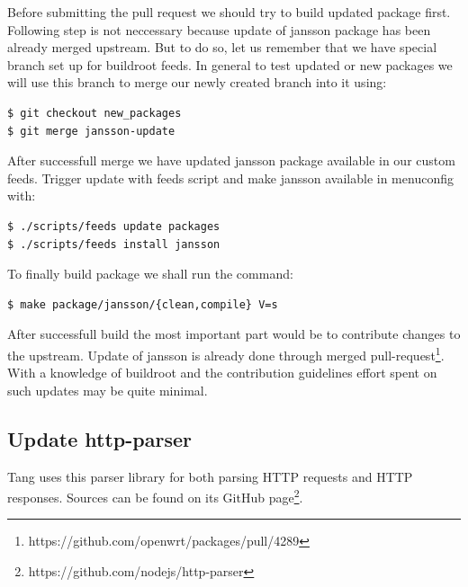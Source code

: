 Before submitting the pull request we should try to build updated package first.
Following step is not neccessary because update of jansson package has been already merged upstream.
But to do so, let us remember that we have special branch set up for buildroot feeds.
In general to test updated or new packages we will use this branch to merge our newly created branch into it using:
\begin{lstlisting}[columns=fixed,basicstyle=\ttfamily\footnotesize,tabsize=4,backgroundcolor=\color{yellow!10}]
$ git checkout new_packages
$ git merge jansson-update
\end{lstlisting}
After successfull merge we have updated jansson package available in our custom feeds.
Trigger update with feeds script and make jansson available in menuconfig with:
\begin{lstlisting}[columns=fixed,basicstyle=\ttfamily\footnotesize,tabsize=4,backgroundcolor=\color{yellow!10}]
$ ./scripts/feeds update packages
$ ./scripts/feeds install jansson
\end{lstlisting}
To finally build package we shall run the command:
\begin{lstlisting}[columns=fixed,basicstyle=\ttfamily\footnotesize,tabsize=4,backgroundcolor=\color{yellow!10}]
$ make package/jansson/{clean,compile} V=s
\end{lstlisting}

After successfull build the most important part would be to contribute changes to the upstream.
Update of jansson is already done through merged pull-request\footnote{https://github.com/openwrt/packages/pull/4289}.
With a knowledge of buildroot and the contribution guidelines effort spent on such updates may be quite minimal.



\subsection{Update http-parser}\label{http-parser}
Tang uses this parser library for both parsing HTTP requests and HTTP responses.
Sources can be found on its GitHub page\footnote{https://github.com/nodejs/http-parser}.

